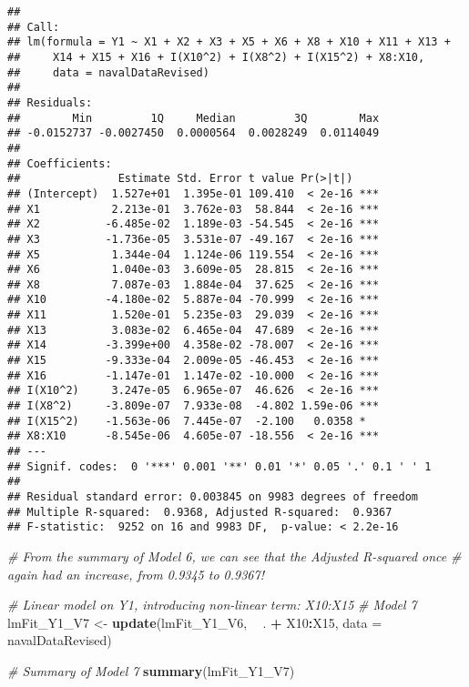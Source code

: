 \documentclass[
]{article}
\newenvironment{Shaded}{\begin{snugshade}}{\end{snugshade}}
\newcommand{\CommentTok}[1]{\textcolor[rgb]{0.56,0.35,0.01}{\textit{#1}}}
\newcommand{\DataTypeTok}[1]{\textcolor[rgb]{0.13,0.29,0.53}{#1}}
\newcommand{\KeywordTok}[1]{\textcolor[rgb]{0.13,0.29,0.53}{\textbf{#1}}}
\newcommand{\NormalTok}[1]{#1}
\newcommand{\OperatorTok}[1]{\textcolor[rgb]{0.81,0.36,0.00}{\textbf{#1}}}
\newcommand{\StringTok}[1]{\textcolor[rgb]{0.31,0.60,0.02}{#1}}
\begin{document}
\begin{verbatim}
## 
## Call:
## lm(formula = Y1 ~ X1 + X2 + X3 + X5 + X6 + X8 + X10 + X11 + X13 + 
##     X14 + X15 + X16 + I(X10^2) + I(X8^2) + I(X15^2) + X8:X10, 
##     data = navalDataRevised)
## 
## Residuals:
##        Min         1Q     Median         3Q        Max 
## -0.0152737 -0.0027450  0.0000564  0.0028249  0.0114049 
## 
## Coefficients:
##               Estimate Std. Error t value Pr(>|t|)    
## (Intercept)  1.527e+01  1.395e-01 109.410  < 2e-16 ***
## X1           2.213e-01  3.762e-03  58.844  < 2e-16 ***
## X2          -6.485e-02  1.189e-03 -54.545  < 2e-16 ***
## X3          -1.736e-05  3.531e-07 -49.167  < 2e-16 ***
## X5           1.344e-04  1.124e-06 119.554  < 2e-16 ***
## X6           1.040e-03  3.609e-05  28.815  < 2e-16 ***
## X8           7.087e-03  1.884e-04  37.625  < 2e-16 ***
## X10         -4.180e-02  5.887e-04 -70.999  < 2e-16 ***
## X11          1.520e-01  5.235e-03  29.039  < 2e-16 ***
## X13          3.083e-02  6.465e-04  47.689  < 2e-16 ***
## X14         -3.399e+00  4.358e-02 -78.007  < 2e-16 ***
## X15         -9.333e-04  2.009e-05 -46.453  < 2e-16 ***
## X16         -1.147e-01  1.147e-02 -10.000  < 2e-16 ***
## I(X10^2)     3.247e-05  6.965e-07  46.626  < 2e-16 ***
## I(X8^2)     -3.809e-07  7.933e-08  -4.802 1.59e-06 ***
## I(X15^2)    -1.563e-06  7.445e-07  -2.100   0.0358 *  
## X8:X10      -8.545e-06  4.605e-07 -18.556  < 2e-16 ***
## ---
## Signif. codes:  0 '***' 0.001 '**' 0.01 '*' 0.05 '.' 0.1 ' ' 1
## 
## Residual standard error: 0.003845 on 9983 degrees of freedom
## Multiple R-squared:  0.9368, Adjusted R-squared:  0.9367 
## F-statistic:  9252 on 16 and 9983 DF,  p-value: < 2.2e-16
\end{verbatim}

\begin{Shaded}
\begin{Highlighting}[]
\CommentTok{# From the summary of Model 6, we can see that the Adjusted R-squared once}
\CommentTok{# again had an increase, from 0.9345 to 0.9367!}

\CommentTok{# Linear model on Y1, introducing non-linear term: X10:X15}
\CommentTok{# Model 7}
\NormalTok{lmFit_Y1_V7 <-}\StringTok{ }\KeywordTok{update}\NormalTok{(lmFit_Y1_V6, }\OperatorTok{~}\StringTok{ }\NormalTok{. }\OperatorTok{+}\StringTok{ }\NormalTok{X10}\OperatorTok{:}\NormalTok{X15, }\DataTypeTok{data =}\NormalTok{ navalDataRevised)}

\CommentTok{# Summary of Model 7}
\KeywordTok{summary}\NormalTok{(lmFit_Y1_V7)}
\end{Highlighting}
\end{Shaded}
\end{document}
